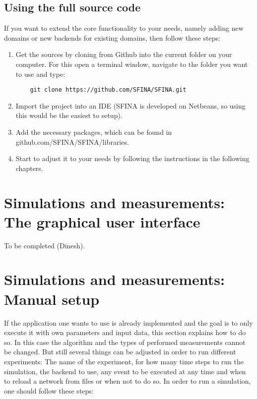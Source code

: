 \documentclass[11pt,fleqn]{book} %
\newcommand{\backend}[1][]{backend#1}
\newcommand{\domain}[1][]{domain#1}
\begin{document}
\subsection{Using the full source code}
If you want to extend the core functionality to your needs, namely adding new \domain{s} or new \backend{s} for existing \domain{s}, then follow these steps:
\begin{enumerate}
	\item Get the sources by cloning from Github into the current folder on your computer. For this open a terminal window, navigate to the folder you want to use and type: 
	\begin{lstlisting}
	git clone https://github.com/SFINA/SFINA.git
	\end{lstlisting}
	\item Import the project into an IDE (SFINA is developed on Netbeans, so using this would be the easiest to setup).
	\item Add the necessary packages, which can be found in github.com/SFINA/SFINA/libraries.
	\item Start to adjust it to your needs by following the instructions in the following chapters.
\end{enumerate}

\section{Simulations and measurements: The graphical user interface}
To be completed (Dinesh).

\section{Simulations and measurements: Manual setup}\label{sec:Simulation_Measurements}
If the application one wants to use is already implemented and the goal is to only execute it with own parameters and input data, this section explains how to do so. In this case the algorithm and the types of performed measurements cannot be changed. But still several things can be adjusted in order to run different experiments: The name of the experiment, for how many time steps to run the simulation, the \backend{} to use, any event to be executed at any time and when to reload a network from files or when not to do so. In order to run a simulation, one should follow these steps: 
\end{document}
